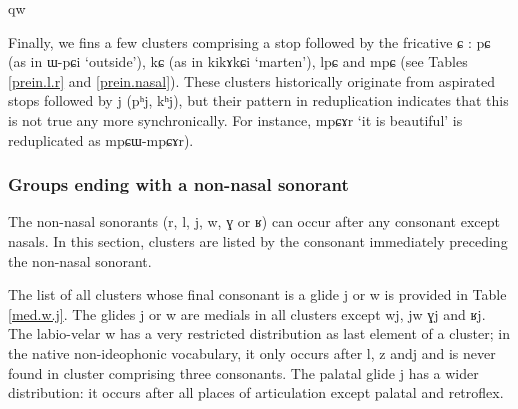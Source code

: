 qw\documentclass[oldfontcommands,oneside,a4paper,11pt]{article}
\newcommand{\ipa}[1]{{\phon #1}} %
\begin{document}
Finally, we fins a few clusters comprising a stop followed by the fricative \ipa{ɕ} :  \ipa{pɕ}  (as in \ipa{ɯ-pɕi}  `outside'),  \ipa{kɕ}  (as in \ipa{kikɤkɕi}  `marten'), \ipa{lpɕ} and \ipa{mpɕ} (see Tables \ref{prein.l.r} and  \ref{prein.nasal}). These clusters historically originate from aspirated stops followed by \ipa{j} (\ipa{pʰj}, \ipa{kʰj}), but their pattern in reduplication indicates that this is not true any more synchronically. For instance, \ipa{mpɕɤr} `it is beautiful' is reduplicated as \ipa{mpɕɯ-mpɕɤr}).

 \subsubsection{Groups ending with a non-nasal sonorant } \label{sec:medial}
  The non-nasal sonorants (\ipa{r}, \ipa{l}, \ipa{j}, \ipa{w}, \ipa{ɣ} or \ipa{ʁ}) can occur after any consonant except nasals. In this section, clusters are listed by the consonant immediately preceding the non-nasal sonorant.  
  
  
  
  The list of all clusters whose final consonant is a glide  \ipa{j} or \ipa{w} is provided in Table \ref{med.w.j}. The glides  \ipa{j} or \ipa{w} are medials in all clusters except \ipa{wj}, \ipa{jw} \ipa{ɣj} and \ipa{ʁj}. The labio-velar \ipa{w} has a very restricted distribution as last element of a cluster; in the native non-ideophonic vocabulary, it only occurs after \ipa{l}, \ipa{z} and{j} and is never found in cluster comprising three consonants. The palatal glide \ipa{j} has a wider distribution: it occurs after all places of articulation except palatal and retroflex.
  
  
  
\end{document}
